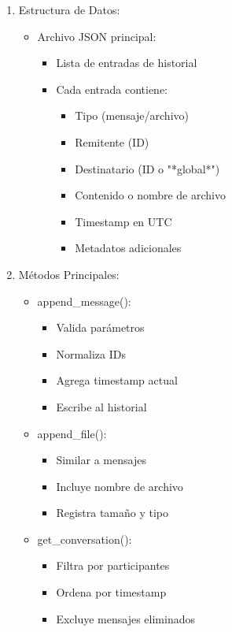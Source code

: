 \documentclass[12pt]{article}
\begin{document}
\begin{enumerate}
    \item Estructura de Datos:
    \begin{itemize}
        \item Archivo JSON principal:
        \begin{itemize}
            \item Lista de entradas de historial
            \item Cada entrada contiene:
            \begin{itemize}
                \item Tipo (mensaje/archivo)
                \item Remitente (ID)
                \item Destinatario (ID o "*global*")
                \item Contenido o nombre de archivo
                \item Timestamp en UTC
                \item Metadatos adicionales
            \end{itemize}
        \end{itemize}
    \end{itemize}

    \item Métodos Principales:
    \begin{itemize}
        \item append\_message():
        \begin{itemize}
            \item Valida parámetros
            \item Normaliza IDs
            \item Agrega timestamp actual
            \item Escribe al historial
        \end{itemize}
        \item append\_file():
        \begin{itemize}
            \item Similar a mensajes
            \item Incluye nombre de archivo
            \item Registra tamaño y tipo
        \end{itemize}
        \item get\_conversation():
        \begin{itemize}
            \item Filtra por participantes
            \item Ordena por timestamp
            \item Excluye mensajes eliminados
        \end{itemize}
    \end{itemize}


\end{enumerate}
\end{document}
